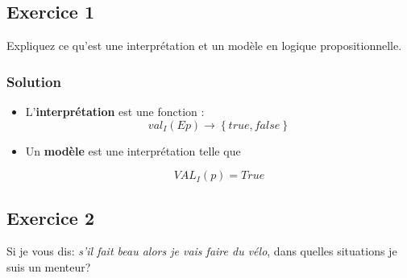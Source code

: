 

\subsection*{Exercice 1}
Expliquez ce qu'est une interprétation et un modèle en logique propositionnelle.


\subsubsection*{Solution}

    \begin{itemize}
            \item L'\textbf{interprétation} est une fonction :
            \begin{equation*}
                val_{I}(Ep)\rightarrow \left \{true, false \right \}
            \end{equation*}
            
            \item Un \textbf{modèle} est une interprétation telle que
            
            \begin{equation*}
                VAL_{I}(p) = True
            \end{equation*}
            
        \end{itemize}

% 

\subsection*{Exercice 2}
Si je vous dis: \textit{s'il fait beau alors je vais faire du vélo}, dans quelles situations je suis un menteur?

